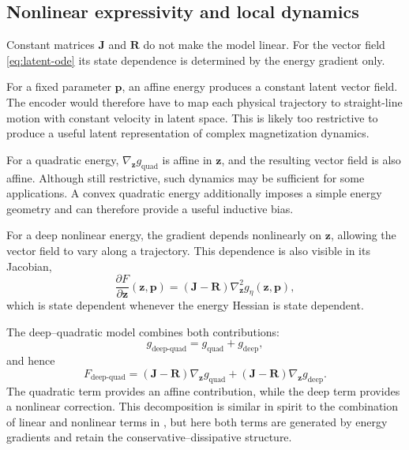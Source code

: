 \documentclass[a4paper,11pt]{article}
\newcommand{\z}{\bm z}
\newcommand{\p}{\bm p}
\newcommand{\Jop}{\bm J}
\newcommand{\Rop}{\bm R}
\newcommand{\Genergy}{g_{\eta}}
\begin{document}
\subsection{Nonlinear expressivity and local dynamics}
Constant matrices $\Jop$ and $\Rop$ do not make the model linear. For the vector field \eqref{eq:latent-ode} its state dependence is determined by the energy gradient only.

For a fixed parameter \(\p\), an affine energy produces a constant latent vector field. The encoder would therefore have to map each physical trajectory to straight-line motion with constant velocity in latent space. This is likely too restrictive to produce a useful latent representation of complex magnetization dynamics.

For a quadratic energy, $\nabla_{\z}g_{\mathrm{quad}}$ is affine in $\z$, and the resulting vector field is also affine. 
Although still restrictive, such dynamics may be sufficient for some applications. A convex quadratic energy additionally imposes a simple energy geometry and can therefore provide a useful inductive bias.

For a deep nonlinear energy, the gradient depends nonlinearly on $\z$, allowing the vector field to vary along a trajectory. This dependence is also visible in its Jacobian,
\begin{equation}
\frac{\partial F}{\partial\z}(\z,\p) = (\Jop-\Rop)\nabla_{\z}^{2}\Genergy(\z,\p),
\end{equation}
which is state dependent whenever the energy Hessian is state dependent.

The deep--quadratic model combines both contributions:
\begin{equation}
g_{\mathrm{deep\text{-}quad}}=g_{\mathrm{quad}}+g_{\mathrm{deep}},
\end{equation}
and hence
\begin{equation}
F_{\mathrm{deep\text{-}quad}}=(\Jop-\Rop)\nabla_{\z}g_{\mathrm{quad}} + (\Jop-\Rop)\nabla_{\z}g_{\mathrm{deep}}.
\end{equation}
The quadratic term provides an affine contribution, while the deep term provides a nonlinear correction. This decomposition is similar in spirit to the combination of linear and nonlinear terms in \cite{linot2023stabilized}, but here both terms are generated by energy gradients and retain the conservative--dissipative structure.
\end{document}
